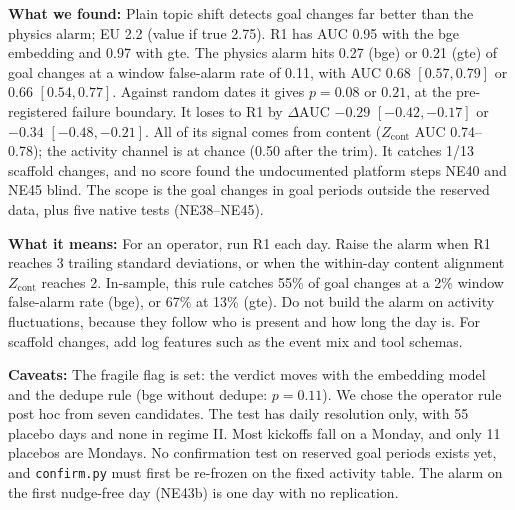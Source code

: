 \textbf{What we found:} Plain topic shift detects goal changes far better than the physics alarm; EU 2.2 (value if true 2.75). R1 has AUC 0.95 with the bge embedding and 0.97 with gte. The physics alarm hits 0.27 (bge) or 0.21 (gte) of goal changes at a window false-alarm rate of 0.11, with AUC 0.68 $[0.57, 0.79]$ or 0.66 $[0.54, 0.77]$. Against random dates it gives $p=0.08$ or $0.21$, at the pre-registered failure boundary. It loses to R1 by $\Delta$AUC $-0.29$ $[-0.42,-0.17]$ or $-0.34$ $[-0.48,-0.21]$. All of its signal comes from content ($Z_\mathrm{cont}$ AUC 0.74--0.78); the activity channel is at chance (0.50 after the trim). It catches 1/13 scaffold changes, and no score found the undocumented platform steps NE40 and NE45 blind. The scope is the goal changes in goal periods outside the reserved data, plus five native tests (NE38--NE45).

\textbf{What it means:} For an operator, run R1 each day. Raise the alarm when R1 reaches 3 trailing standard deviations, or when the within-day content alignment $Z_\mathrm{cont}$ reaches 2. In-sample, this rule catches 55\% of goal changes at a 2\% window false-alarm rate (bge), or 67\% at 13\% (gte). Do not build the alarm on activity fluctuations, because they follow who is present and how long the day is. For scaffold changes, add log features such as the event mix and tool schemas.

\textbf{Caveats:} The fragile flag is set: the verdict moves with the embedding model and the dedupe rule (bge without dedupe: $p=0.11$). We chose the operator rule post hoc from seven candidates. The test has daily resolution only, with 55 placebo days and none in regime II. Most kickoffs fall on a Monday, and only 11 placebos are Mondays. No confirmation test on reserved goal periods exists yet, and \texttt{confirm.py} must first be re-frozen on the fixed activity table. The alarm on the first nudge-free day (NE43b) is one day with no replication.
